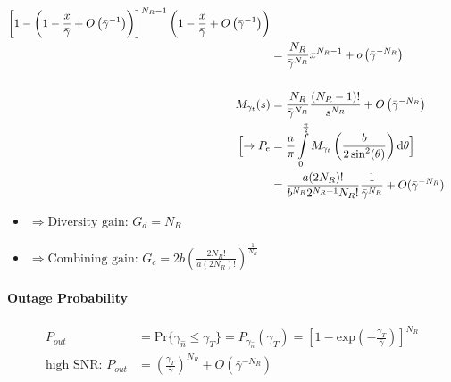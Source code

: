 \documentclass[a4paper, 10pt]{article}
\begin{document}
\begin{itemize}
\begin{align*}
			\left[1-\left(1-\frac{x}{\bar{\gamma}}+O\left(\bar{\gamma}^{-1}\right)\right)\right]^{N_R-1}
			\left(1-\frac{x}{\bar{\gamma}}+O\left(\bar{\gamma}^{-1}\right)\right)\\
			&=\frac{N_R}{\bar{\gamma}^{N_R}}x^{N_R-1}+o\left(\bar{\gamma}^{-N_R}\right)\\ \\
			M_{\gamma_t}(s)
			&=\frac{N_R}{\bar{\gamma}^{N_R}}\frac{(N_R-1)!}{s^{N_R}}+O\left(\bar{\gamma}^{-N_R}\right)\\
			\Bigl[\rightarrow P_e
			&=\frac{a}{\pi}\int\limits^{\frac{\pi}{2}}_0 M_{\gamma_t}\left(\frac{b}{2\sin^2(\theta)}\right)\mathrm{d}\theta\Bigr]\\
			&=\frac{a(2N_R)!}{b^{N_R}2^{N_R+1}N_R!}\frac{1}{\bar{\gamma}^{N_R}}+O(\bar{\gamma}^{-N_R})
			\end{align*}
		\begin{itemize}
			\item[] $\Longrightarrow \text{Diversity gain: } G_d = N_R$
			\item[] $\Longrightarrow \text{Combining gain: } G_c = 2b\left(\frac{2N_R!}{a(2N_R)!}\right)^{\frac{1}{N_R}}$
		\end{itemize}
	\end{itemize}

\paragraph{Outage Probability}
		\begin{align*}
			P_{out}&=\mathrm{Pr}\{\gamma_{\hat{n}} \leq \gamma_T \}=P_{\gamma_{\hat{n}}}(\gamma_T)=\left[1-\mathrm{exp}\left(-\frac{\gamma_T}{\bar{\gamma}}\right)\right]^{N_R}\\
			\text{high SNR: } P_{out}&=\left(\frac{\gamma_T}{\bar{\gamma}}\right)^{N_R}+O\left(\bar{\gamma}^{-N_R}\right)
		\end{align*}
\end{document}
